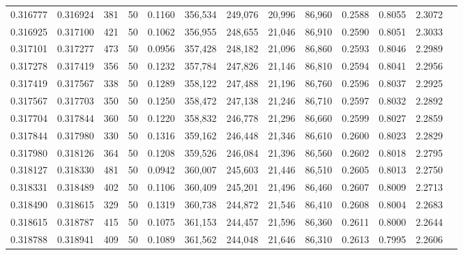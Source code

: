 \begin{tabular}{rrrrrrrrrrrrr}
0.316777 & 0.316924 &   381 &  50 &                                     0.1160 & 356,534 & 249,076 &  20,996 &  86,960 & 0.2588 & 0.8055 & 2.3072 \\
0.316925 & 0.317100 &   421 &  50 &                                     0.1062 & 356,955 & 248,655 &  21,046 &  86,910 & 0.2590 & 0.8051 & 2.3033 \\
0.317101 & 0.317277 &   473 &  50 &                                     0.0956 & 357,428 & 248,182 &  21,096 &  86,860 & 0.2593 & 0.8046 & 2.2989 \\
0.317278 & 0.317419 &   356 &  50 &                                     0.1232 & 357,784 & 247,826 &  21,146 &  86,810 & 0.2594 & 0.8041 & 2.2956 \\
0.317419 & 0.317567 &   338 &  50 &                                     0.1289 & 358,122 & 247,488 &  21,196 &  86,760 & 0.2596 & 0.8037 & 2.2925 \\
0.317567 & 0.317703 &   350 &  50 &                                     0.1250 & 358,472 & 247,138 &  21,246 &  86,710 & 0.2597 & 0.8032 & 2.2892 \\
0.317704 & 0.317844 &   360 &  50 &                                     0.1220 & 358,832 & 246,778 &  21,296 &  86,660 & 0.2599 & 0.8027 & 2.2859 \\
0.317844 & 0.317980 &   330 &  50 &                                     0.1316 & 359,162 & 246,448 &  21,346 &  86,610 & 0.2600 & 0.8023 & 2.2829 \\
0.317980 & 0.318126 &   364 &  50 &                                     0.1208 & 359,526 & 246,084 &  21,396 &  86,560 & 0.2602 & 0.8018 & 2.2795 \\
0.318127 & 0.318330 &   481 &  50 &                                     0.0942 & 360,007 & 245,603 &  21,446 &  86,510 & 0.2605 & 0.8013 & 2.2750 \\
0.318331 & 0.318489 &   402 &  50 &                                     0.1106 & 360,409 & 245,201 &  21,496 &  86,460 & 0.2607 & 0.8009 & 2.2713 \\
0.318490 & 0.318615 &   329 &  50 &                                     0.1319 & 360,738 & 244,872 &  21,546 &  86,410 & 0.2608 & 0.8004 & 2.2683 \\
0.318615 & 0.318787 &   415 &  50 &                                     0.1075 & 361,153 & 244,457 &  21,596 &  86,360 & 0.2611 & 0.8000 & 2.2644 \\
0.318788 & 0.318941 &   409 &  50 &                                     0.1089 & 361,562 & 244,048 &  21,646 &  86,310 & 0.2613 & 0.7995 & 2.2606 \\

\end{tabular}
